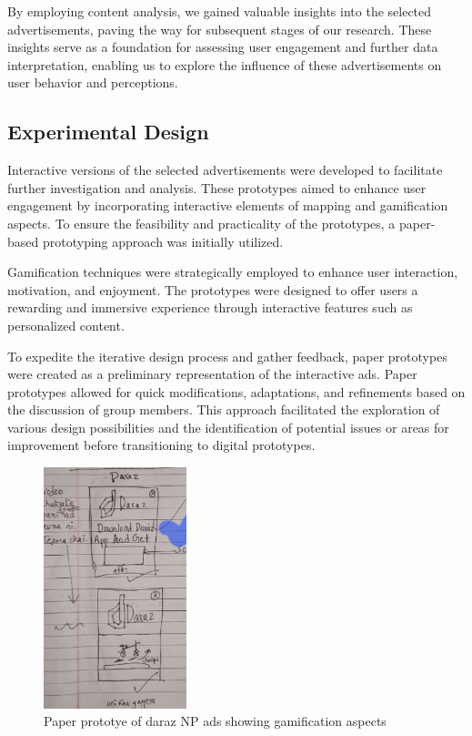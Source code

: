 \documentclass[journal]{IEEEtran}
\begin{document}
By employing content analysis, we gained valuable insights into the selected advertisements,
paving the way for subsequent stages of our research. These insights serve as a foundation
for assessing user engagement and further data interpretation, enabling us to explore the
influence of these advertisements on user behavior and perceptions.

\subsection{Experimental Design}
Interactive versions of the selected advertisements were developed to facilitate further
investigation and analysis. These prototypes aimed to enhance user engagement by incorporating
interactive elements of mapping and gamification aspects. To ensure the feasibility and practicality of
the prototypes, a paper-based prototyping approach was initially utilized.

Gamification techniques were strategically employed to enhance user interaction, motivation,
and enjoyment. The prototypes were designed to offer users a rewarding and immersive experience
through interactive features such as personalized content.

To expedite the iterative design process and gather feedback, paper prototypes were created as a
preliminary representation of the interactive ads. Paper prototypes allowed for quick modifications,
adaptations, and refinements based on the discussion of group members. This approach facilitated the
exploration of various design possibilities and the identification of potential issues or areas for
improvement before transitioning to digital prototypes.

\begin{figure}[H]
    \centering
    \includegraphics[height=7cm]{paperPrototype.png}
    \caption{Paper prototye of daraz NP ads showing gamification aspects}
\end{figure}
\end{document}
